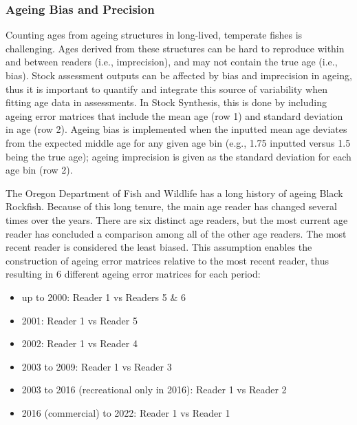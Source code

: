 \documentclass[11pt,
  english,
  letterpaper,
]{article}
\providecommand{\tightlist}{%
  \setlength{\itemsep}{0pt}\setlength{\parskip}{0pt}}
\providecommand{\tightlist}{%
  \setlength{\itemsep}{0pt}\setlength{\parskip}{0pt}}
\begin{document}
\hypertarget{ageing-bias-and-precision}{%
\subsubsection{Ageing Bias and Precision}\label{ageing-bias-and-precision}}

Counting ages from ageing structures in long-lived, temperate fishes is challenging. Ages derived from these structures can be hard to reproduce within and between readers (i.e., imprecision), and may not contain the true age (i.e., bias). Stock assessment outputs can be affected by bias and imprecision in ageing, thus it is important to quantify and integrate this source of variability when fitting age data in assessments. In Stock Synthesis, this is done by including ageing error matrices that include the mean age (row 1) and standard deviation in age (row 2). Ageing bias is implemented when the inputted mean age deviates from the expected middle age for any given age bin (e.g., 1.75 inputted versus 1.5 being the true age); ageing imprecision is given as the standard deviation for each age bin (row 2).

The Oregon Department of Fish and Wildlife has a long history of ageing Black Rockfish. Because of this long tenure, the main age reader has changed several times over the years. There are six distinct age readers, but the most current age reader has concluded a comparison among all of the other age readers. The most recent reader is considered the least biased. This assumption enables the construction of ageing error matrices relative to the most recent reader, thus resulting in 6 different ageing error matrices for each period:

\begin{itemize}
\tightlist
\item
  up to 2000: Reader 1 vs Readers 5 \& 6
\item
  2001: Reader 1 vs Reader 5
\item
  2002: Reader 1 vs Reader 4
\item
  2003 to 2009: Reader 1 vs Reader 3
\item
  2003 to 2016 (recreational only in 2016): Reader 1 vs Reader 2
\item
  2016 (commercial) to 2022: Reader 1 vs Reader 1
\end{itemize}
\end{document}
